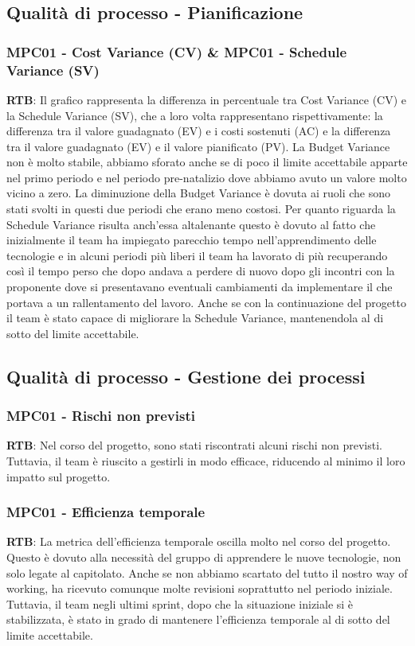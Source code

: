 \documentclass[10pt]{article}
\begin{document}
\begin{justify}
\subsection{Qualità di processo - Pianificazione}
\subsubsection{MPC01 - Cost Variance (CV) \& MPC01 - Schedule Variance (SV)}
\textbf{RTB}: Il grafico rappresenta la differenza in percentuale tra Cost Variance (CV) e la Schedule Variance (SV), che a loro volta rappresentano rispettivamente: la differenza tra il valore guadagnato (EV) e i costi sostenuti (AC) e la differenza tra il valore guadagnato (EV) e il valore pianificato (PV). La Budget Variance non è molto stabile, abbiamo sforato anche se di poco il limite accettabile apparte nel primo periodo e nel periodo pre-natalizio dove abbiamo avuto un valore molto vicino a zero. La diminuzione della Budget Variance è dovuta ai ruoli che sono stati svolti in questi due periodi che erano meno costosi. Per quanto riguarda la Schedule Variance risulta anch'essa altalenante questo è dovuto al fatto che inizialmente il team ha impiegato parecchio tempo nell'apprendimento delle tecnologie e in alcuni periodi più liberi il team ha lavorato di più recuperando così il tempo perso che dopo andava a perdere di nuovo dopo gli incontri con la proponente dove si presentavano eventuali cambiamenti da implementare il che portava a un rallentamento del lavoro. Anche se con la continuazione del progetto il team è stato capace di migliorare la Schedule Variance, mantenendola al di sotto del limite accettabile.
\subsection{Qualità di processo - Gestione dei processi}
\subsubsection{MPC01 - Rischi non previsti}
\textbf{RTB}: Nel corso del progetto, sono stati riscontrati alcuni rischi non previsti. Tuttavia, il team è riuscito a gestirli in modo efficace, riducendo al minimo il loro impatto sul progetto.
\subsubsection{MPC01 - Efficienza temporale}
\textbf{RTB}: La metrica dell'efficienza temporale oscilla molto nel corso del progetto. Questo è dovuto alla necessità del gruppo di apprendere le nuove tecnologie, non solo legate al capitolato. Anche se non abbiamo scartato del tutto il nostro way of working, ha ricevuto comunque molte revisioni soprattutto nel periodo iniziale. Tuttavia, il team negli ultimi sprint, dopo che la situazione iniziale si è stabilizzata, è stato in grado di mantenere l'efficienza temporale al di sotto del limite accettabile.

\end{justify}
\end{document}
